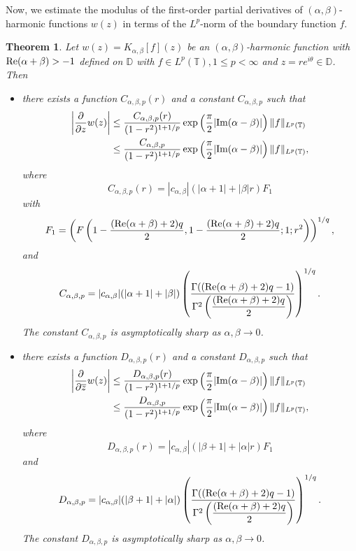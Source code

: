 \documentclass[11pt, reqno]{amsart}
\newtheorem{theorem}{Theorem}
\theoremstyle{definition}
\numberwithin{equation}{section}
\newcommand{\abs}[1]{\left\vert#1\right\vert}
\theoremstyle{remark}
\numberwithin{equation}{section}
\newcommand{\ID}{{\mathbb D}}
\begin{document}
    Now, we estimate the modulus of the first-order partial derivatives of $(\alpha,\beta)$-harmonic functions $w(z)$ in terms of the $L^p$-norm of the boundary function $f$.
	\begin{theorem}\label{bound_of_w_z}
		Let $w(z)=K_{\alpha,\beta}[f](z)$ be an $(\alpha,\beta)$-harmonic function with {$\text{\rm Re}(\alpha+\beta)>-1$} defined on  $\mathbb{D}$  with $f\in L^p(\mathbb{T}),1\leq p< \infty$ and $z=re^{i\theta}\in \ID$. Then
		\begin{itemize}
			\item [(i)]there exists a function $C_{\alpha,\beta,p}(r)$ and a constant $C_{\alpha,\beta,p}$ such that 
			\begin{align*}
            \begin{split}
				\abs{\frac{\partial}{\partial z}w(z)}&\leq \frac{C_{\alpha,\beta,p}(r)}{(1-r^2)^{1+1/p}}\exp\left(\frac{\pi}{2}|\text{\rm Im}(\alpha-\beta)|\right)\|f\|_{L^p(\mathbb{T})}\\&\leq \frac{C_{\alpha,\beta,p}}{(1-r^2)^{1+1/p}}\exp\left(\frac{\pi}{2}|\text{\rm Im}(\alpha-\beta)|\right)\|f\|_{L^p(\mathbb{T})},
                \end{split}
			\end{align*}
			where
			\begin{equation*}
				C_{\alpha,\beta,p}(r)=|c_{\alpha,\beta}|(|\alpha +1 |+|\beta| r)F_1
			\end{equation*}
            with $$F_1=\left(F\left(1-\frac{(\text{\rm Re}(\alpha+\beta)+2)q}{2},
            1-\frac{(\text{\rm Re}(\alpha+\beta)+2)q}{2};1;r^2\right)\right)^{1/q},$$
            and 
			\begin{equation*}
				C_{\alpha,\beta,p}=|c_{\alpha,\beta}|(|\alpha +1 |+|\beta|)\left(\frac{\Gamma((\text{\rm Re}(\alpha+\beta)+2)q-1)}{\Gamma^2\left(\dfrac{(\text{\rm Re}(\alpha+\beta)+2)q}{2}\right)}\right)^{1/q}.
			\end{equation*}
			The constant $C_{\alpha,\beta,p}$ is asymptotically sharp as $\alpha,\beta \rightarrow 0$.
			
			\item[(ii)] there exists a function $D_{\alpha,\beta,p}(r)$ and a constant $D_{\alpha,\beta,p}$ such that 
			\begin{align*}
            \begin{split}
				\bigg|\frac{\partial}{\partial \overline{z}}w(z)\bigg|&\leq \frac{D_{\alpha,\beta,p}(r)}{(1-r^2)^{1+1/p}}\exp\left(\frac{\pi}{2}|\text{\rm Im}(\alpha-\beta)|\right)\|f\|_{L^p(\mathbb{T})}\\&\leq \frac{D_{\alpha,\beta,p}}{(1-r^2)^{1+1/p}}\exp\left(\frac{\pi}{2}|\text{\rm Im}(\alpha-\beta)|\right)\|f\|_{L^p(\mathbb{T})},
                 \end{split}
			\end{align*}
			where $$D_{\alpha,\beta,p}(r)=|c_{\alpha,\beta}|(|\beta +1 |+|\alpha| r)F_1$$ and $$D_{\alpha,\beta,p}=|c_{\alpha,\beta}|(|\beta +1 |+|\alpha|)\left(\frac{\Gamma((\text{\rm Re}(\alpha+\beta)+2)q-1)}{\Gamma^2\left(\dfrac{(\text{\rm Re}(\alpha+\beta)+2)q}{2}\right)}\right)^{1/q}.$$
			The constant $D_{\alpha,\beta,p}$ is asymptotically sharp as $\alpha,\beta \rightarrow 0$.
		\end{itemize}
	\end{theorem}
\end{document}
